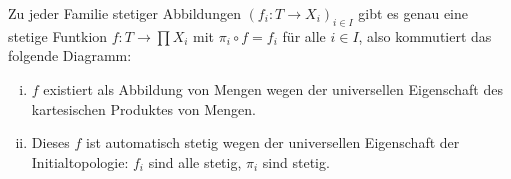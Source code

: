 \begin{satz}
Zu jeder Familie stetiger Abbildungen $(f_i: T \to X_i)_{i \in I}$ gibt es genau eine stetige Funtkion $f: T \to \prod X_i$ mit $\pi_i \circ f = f_i$ für alle $i \in I$, also kommutiert das folgende Diagramm:
\begin{center}
\end{center}
\end{satz}
\begin{beweis}
\begin{enumerate}[(i)]
\item $f$ existiert als Abbildung von Mengen wegen der universellen Eigenschaft des kartesischen Produktes von Mengen.
\item Dieses $f$ ist automatisch stetig wegen der universellen Eigenschaft der Initialtopologie: $f_i$ sind alle stetig, $\pi_i$ sind stetig.
\end{enumerate}
\end{beweis}